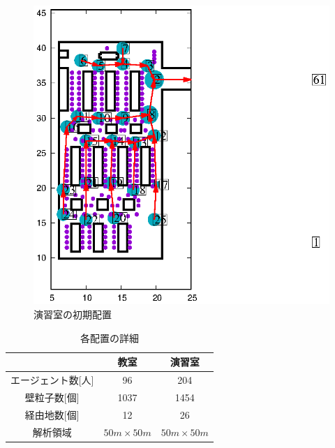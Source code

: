\begin{figure}[tb]
\begin{minipage}[b]{0.5\columnwidth}
		\includegraphics[width=\columnwidth]{figure/pc_m.eps}
		\caption{演習室の初期配置}
    \label{fig:pc_haichi}
	\end{minipage}
\end{figure}
\fi


\begin{table}[tb]
  \begin{center}
    \caption{各配置の詳細}
    \label{tb:haichi_para}
    \begin{tabular}{c|c|c}
      \hline \hline
      & 教室 & 演習室 \\ \hline 
      エージェント数[人] & 96 & 204 \\ \hline
      壁粒子数[個] & 1037 & 1454\\ \hline
      経由地数[個] & 12   & 26 \\ \hline
      解析領域 & $50m\times50m$ & $50m\times50m$ \\ \hline
    \end{tabular}
  \end{center}
\end{table}
